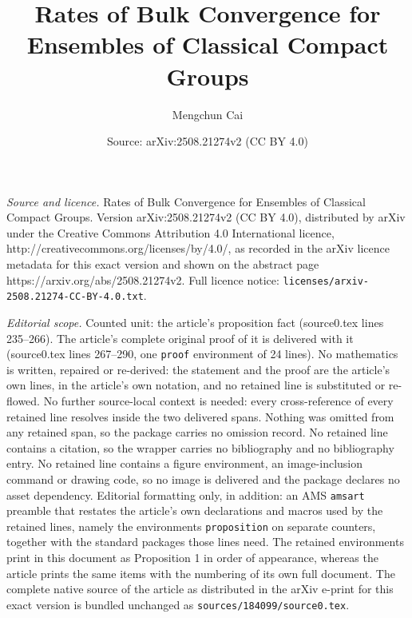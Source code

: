 \documentclass[10pt,a4paper]{amsart}
\title{Rates of Bulk Convergence for Ensembles of Classical Compact Groups}
\author{Mengchun Cai}
\date{Source: arXiv:2508.21274v2 (CC BY 4.0)}
\begin{document}
\maketitle

\noindent\emph{Source and licence.} Rates of Bulk Convergence for Ensembles of Classical Compact Groups. Version arXiv:2508.21274v2 (CC BY 4.0), distributed by arXiv under the Creative Commons Attribution 4.0 International licence, http://creativecommons.org/licenses/by/4.0/, as recorded in the arXiv licence metadata for this exact version and shown on the abstract page https://arxiv.org/abs/2508.21274v2. Full licence notice: \texttt{licenses/arxiv-2508.21274-CC-BY-4.0.txt}.\par\smallskip

\noindent\textit{Editorial scope.} Counted unit: the article's proposition fact (source0.tex lines 235--266). The article's complete original proof of it is delivered with it (source0.tex lines 267--290, one \texttt{proof} environment of 24 lines). No mathematics is written, repaired or re-derived: the statement and the proof are the article's own lines, in the article's own notation, and no retained line is substituted or re-flowed.  No further source-local context is needed: every cross-reference of every retained line resolves inside the two delivered spans.  Nothing was omitted from any retained span, so the package carries no omission record.  No retained line contains a citation, so the wrapper carries no bibliography and no bibliography entry.  No retained line contains a figure environment, an image-inclusion command or drawing code, so no image is delivered and the package declares no asset dependency.  Editorial formatting only, in addition: an AMS \texttt{amsart} preamble that restates the article's own declarations and macros used by the retained lines, namely the environments \texttt{proposition} on separate counters, together with the standard packages those lines need.  The retained environments print in this document as Proposition 1 in order of appearance, whereas the article prints the same items with the numbering of its own full document.  The complete native source of the article as distributed in the arXiv e-print for this exact version is bundled unchanged as \texttt{sources/184099/source0.tex}.
\end{document}
